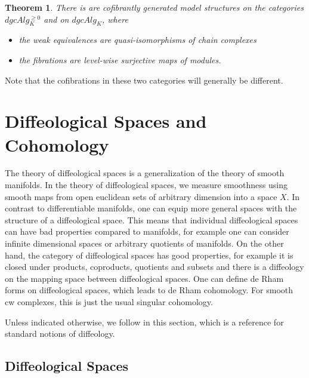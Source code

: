 \documentclass{scrartcl}
\theoremstyle{plain}
\newtheorem{theorem}{Theorem}[section]
\theoremstyle{definition}
\begin{document}
\begin{theorem}
    There is are cofibrantly generated model structures on the categories $dgcAlg_K^{\geq 0}$ and on $dgcAlg_K$, where 
    \begin{itemize}
        \item the weak equivalences are quasi-isomorphisms of chain complexes
        \item the fibrations are level-wise surjective maps of modules.
    \end{itemize}
\end{theorem}
Note that the cofibrations in these two categories will generally be different.

\section{Diffeological Spaces and Cohomology}
The theory of diffeological spaces is a generalization of the theory of smooth manifolds. In the theory of diffeological spaces, we measure smoothness using smooth maps from open euclidean sets of arbitrary dimension into a space $X$. In contrast to differentiable manifolds, one can equip more general spaces with the structure of a diffeological space. This means that individual diffeological spaces can have bad properties compared to manifolds, for example one can consider infinite dimensional spaces or arbitrary quotients of manifolds. On the other hand, the category of diffeological spaces has good properties, for example it is closed under products, coproducts, quotients and subsets and there is a diffeology on the mapping space between diffeological spaces. One can define de Rham forms on diffeological spaces, which leads to de Rham cohomology. For smooth cw complexes, this is just the usual singular cohomology. 

Unless indicated otherwise, we follow \cite{iglesias2013diffeology} in this section, which is a reference for standard notions of diffeology. 


\subsection{Diffeological Spaces}\label{subsec:diffeological}
\end{document}
